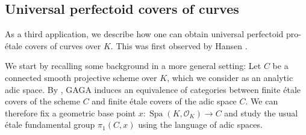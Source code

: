 \documentclass[10pt,oneside]{amsart}
\theoremstyle{definition}
\newcommand{\Spa}{\operatorname{Spa}}
\renewcommand{\O}{\mathcal{O}}
\begin{document}
	\subsection{Universal perfectoid covers of curves}
	
As a third application, we describe how one can obtain universal perfectoid pro-\'etale covers of curves over $K$. This was first observed by Hansen \cite{Hansen-blog}.
	
	We start by recalling some background in a more general setting: Let $C$ be a connected smooth projective scheme over $K$, which we consider as an analytic adic space. By \cite[Theorem 3.1]{LutRiemann}, GAGA induces an equivalence of categories between finite \'etale covers of the scheme $C$ and finite \'etale covers of the adic space $C$. We can therefore fix a geometric base point $x:\Spa({K},\O_{{K}})\to C$ and study the usual \'etale fundamental group $\pi_1(C,x)$ using the language of adic spaces. 
	
\end{document}
